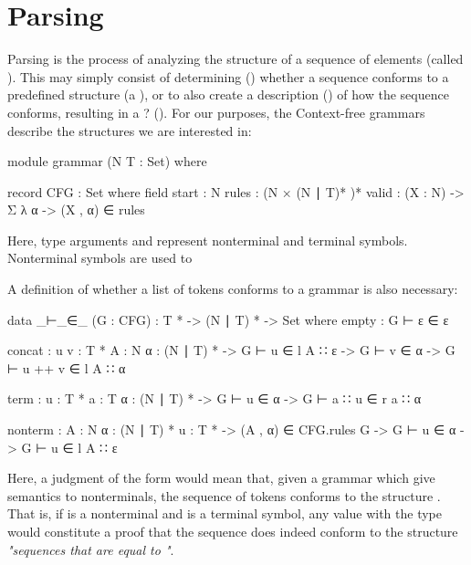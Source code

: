 \chapter{Parsing}

	Parsing is the process of analyzing the structure of a sequence of elements
	(called ). This may simply consist of determining
	() whether a sequence conforms to a predefined structure
	(a ), or to also create a description () of
	how the sequence conforms, resulting in a ? (). For our
	purposes, the Context-free grammars describe the structures we are
	interested in:
	
	\begin{code}

		module grammar (N T : Set) where

		record CFG : Set where
		  field
		    start : N
		    rules : (N × (N ∣ T)* )*
    		valid : (X : N) -> Σ λ α -> (X , α) ∈ rules

	\end{code}

	Here, type arguments  and  represent nonterminal and 
	terminal symbols. Nonterminal symbols are used to 

	A definition of whether a list of tokens conforms to a grammar is also 
	necessary:

	\begin{code}
	
		data _⊢_∈_ (G : CFG) :  T * -> (N ∣ T) * -> Set where
		  empty :
		    G ⊢ ε ∈ ε
		
		  concat : {u v : T *} {A : N} {α : (N ∣ T) *} ->
		    G ⊢ u ∈ l A ∷ ε -> G ⊢ v ∈ α -> G ⊢ u ++ v ∈ l A ∷ α
		
		  term : {u : T *} {a : T} {α : (N ∣ T) *} ->
		    G ⊢ u ∈ α -> G ⊢ a ∷ u ∈ r a ∷ α
		
		  nonterm : {A : N} {α : (N ∣ T) *} {u : T *} ->
		    (A , α) ∈ CFG.rules G -> G ⊢ u ∈ α -> G ⊢ u ∈ l A ∷ ε

	\end{code}

	Here, a judgment of the form  would mean that, given a
	grammar  which give semantics to nonterminals, the sequence of
	tokens  conforms to the structure . That is, if
	 is a nonterminal and  is a terminal symbol, any value
	with the type  would constitute a proof
	that the sequence  does indeed conform to the structure
	\emph{"sequences that are equal to "}.

